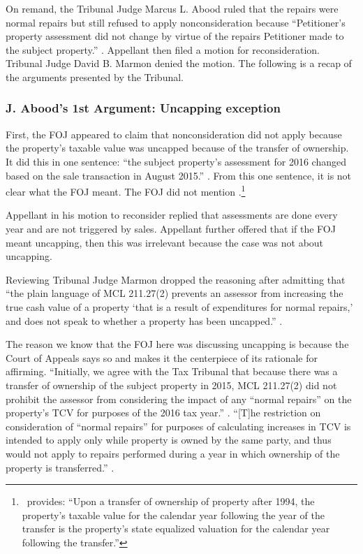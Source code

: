 \documentclass[12pt,\documentclassflag]{michiganCourtOfAppealsBrief}
\begin{document}
On remand, the Tribunal Judge Marcus L. Abood ruled that the repairs were normal repairs but still refused to apply nonconsideration because ``Petitioner's property assessment did not change by virtue of the repairs Petitioner made to the subject property.'' .
Appellant then filed a motion for reconsideration. Tribunal Judge David B. Marmon denied the motion.
The following is a recap of the arguments presented by the Tribunal.

\subsubsection{J. Abood's 1st Argument: Uncapping exception}

First, the FOJ appeared to claim that nonconsideration did not apply because the property's taxable value was uncapped because of the transfer of ownership.
It did this in one sentence:
``the subject property's assessment for 2016 changed based on the sale transaction in August 2015.''
.
From this one sentence, it is not clear what the FOJ meant. The FOJ did not mention \cite{MCL 211.27a(3)}.\footnote{\cite[s]{MCL 211.27a(3)}\ provides: ``Upon a transfer of ownership of property after 1994, the property's taxable value for the calendar year following the year of the transfer is the property's state equalized valuation for the calendar year following the transfer.''}

Appellant in his motion to reconsider replied that assessments are done every year and are not triggered by sales. Appellant further offered that if the FOJ meant uncapping, then this was irrelevant because the case was not about uncapping.

Reviewing Tribunal Judge Marmon dropped the reasoning after admitting that
``the plain language of MCL 211.27(2) prevents an assessor from increasing the true cash value of a property `that is a result of expenditures for normal repairs,' and does not speak to whether a property has been uncapped.''
.

The reason we know that the FOJ here was discussing uncapping is because the Court of Appeals says so and  makes it the centerpiece of its rationale for affirming. ``Initially, we agree with the Tax Tribunal that because there was a transfer of ownership of the
subject property in 2015, MCL 211.27(2) did not prohibit the assessor from considering the impact
of any ``normal repairs'' on the property's TCV for purposes of the 2016 tax year.'' . ``[T]he restriction on consideration of ``normal repairs'' for purposes of calculating
increases in TCV is intended to apply only while property is owned by the same party, and thus
would not apply to repairs performed during a year in which ownership of the property is
transferred.'' .
\end{document}
